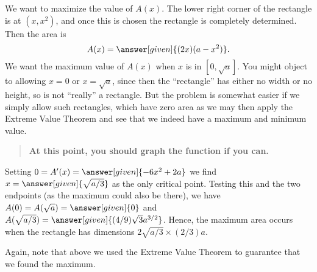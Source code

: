 \documentclass{ximera}
\begin{document}
\begin{example}
\begin{image}
\end{image}
\begin{explanation}
We want to maximize the value of $A(x)$.  The lower right corner of the
rectangle is at $(x,x^2)$, and once this is chosen the rectangle is
completely determined. Then the area is
\[
A(x)=\answer[given]{(2x)(a-x^2)}.
\] 
We want the maximum value of $A(x)$ when $x$ is in $[0,\sqrt{a}]$. You
might object to allowing $x=0$ or $x=\sqrt{a}$, since then the
``rectangle'' has either no width or no height, so is not ``really'' a
rectangle. But the problem is somewhat easier if we simply allow such
rectangles, which have zero area as we may then apply the Extreme
Value Theorem and see that we indeed have a maximum and minimum value.
\begin{quote}
  \textbf{At this point, you should graph the function if you can.}
\end{quote}
Setting $0=A'(x)=\answer[given]{-6x^2+2a}$ we find
$x=\answer[given]{\sqrt{a/3}}$ as the only critical point. Testing
this and the two endpoints (as the maximum could also be there), we
have $A(0)=A(\sqrt{a})=\answer[given]{0}$ and
$A(\sqrt{a/3})=\answer[given]{(4/9)\sqrt{3}a^{3/2}}$. Hence, the maximum area
occurs when the rectangle has dimensions $2\sqrt{a/3}\times (2/3)a$.
\end{explanation}
\end{example}

Again, note that above we used the Extreme Value Theorem to guarantee
that we found the maximum.
\end{document}

